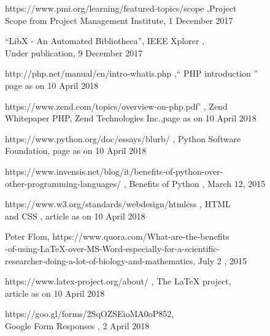 \documentclass[a4paper,12pt]{report}
\begin{document}
\begin{enumerate}[label={[\arabic*]}]
     \item https://www.pmi.org/learning/featured-topics/scope ,Project \\
     Scope from Project Management Institute, 1 December 2017

     \item {``LibX - An Automated Bibliotheca''}, IEEE Xplorer , \\
     Under publication, 9 December 2017

     \item http://php.net/manual/en/intro-whatis.php ,{`` PHP introduction ''}\\
     page as on 10 April 2018

     \item https://www.zend.com/topics/overview-on-php.pdf' , Zend \\
     Whitepaper PHP, Zend Technologies Inc.,page as on  10 April 2018

     \item https://www.python.org/doc/essays/blurb/ , Python Software \\
     Foundation, page as on 10 April 2018

     \item https://www.invensis.net/blog/it/benefits-of-python-over- \\
     other-programming-languages/ , Benefits of Python , March 12, 2015

     \item https://www.w3.org/standards/webdesign/htmlcss , HTML \\
     and CSS , article as on 10 April 2018    %

     \item Peter Flom, https://www.quora.com/What-are-the-benefits\\
     -of-using-LaTeX-over-MS-Word-especially-for-a-scientific-\\
     researcher-doing-a-lot-of-biology-and-mathematics, July 2 , 2015

     \item https://www.latex-project.org/about/ , The LaTeX project,\\
     article as on 10 April 2018

     \item https://goo.gl/forms/2SqOZSEioMA0oP852, \\
     Google Form Responses , 2 April 2018

\end{enumerate}
\end{document}
